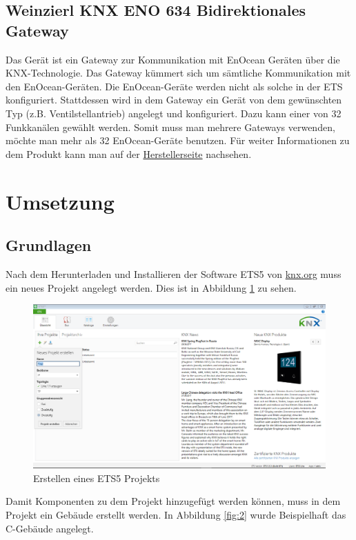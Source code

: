 \documentclass[a4paper]{article}
\begin{document}
	\subsection{Weinzierl KNX ENO 634 Bidirektionales Gateway}
	Das Gerät ist ein Gateway zur Kommunikation mit EnOcean Geräten über die KNX-Technologie. Das Gateway kümmert sich um sämtliche Kommunikation mit den EnOcean-Geräten. Die EnOcean-Geräte werden nicht als solche in der ETS konfiguriert. Stattdessen wird in dem Gateway ein Gerät von dem gewünschten Typ (z.B. Ventilstellantrieb) angelegt und konfiguriert. Dazu kann einer von 32 Funkkanälen gewählt werden. Somit muss man mehrere Gateways verwenden, möchte man mehr als 32 EnOcean-Geräte benutzen.
	Für weiter Informationen zu dem Produkt kann man auf der \href{https://www.weinzierl.de/index.php/de/alles-knx1/knx-devices/knx-eno-634}{Herstellerseite} nachsehen.

\section{Umsetzung}
\subsection{Grundlagen}
Nach dem Herunterladen und Installieren der Software ETS5 von \href{https://www.knx.org/knx-de/software/ets/herunterladen/index.php}{knx.org} muss ein neues Projekt angelegt werden. Dies ist in Abbildung \ref{fig:1} zu sehen.

\begin{figure}[H]
\centering
\includegraphics[width=13cm]{Doku/1}
\caption{Erstellen eines ETS5 Projekts}
\label{fig:1}
\end{figure}

Damit Komponenten zu dem Projekt hinzugefügt werden können, muss in dem Projekt ein Gebäude erstellt werden. In Abbildung \ref{fig:2} wurde Beispielhaft das C-Gebäude angelegt.
\end{document}

